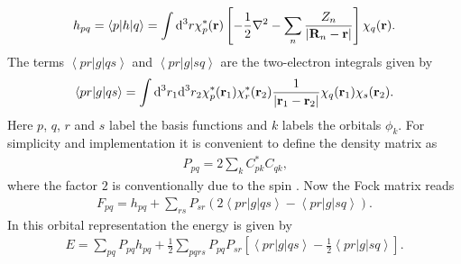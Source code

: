\documentclass[twoside,        %
			   12pt,			%
               BCOR10mm,       %
               ngerman,english  %
               ]{scrartcl}
\begin{document}
\begin{align*}
h_{pq} = \left< p|h|q\right> = \int \mathrm{d}^3 r \chi_p^*(\mathbf{r})\left[ -\frac{1}{2} \nabla^2 - \sum\limits_n \frac{Z_n}{\left| \mathbf{R}_n -\mathbf{r} \right|} \right]\chi_q(\mathbf{r})\text{.}
\end{align*} The terms $\left<pr|g|qs\right>$ and $\left<pr|g|sq\right>$ are the two-electron integrals given by
\begin{align*}
\left<pr|g|qs\right> = \int \mathrm{d}^3 r_1 \mathrm{d}^3 r_2 \chi_p^*(\mathbf{r}_1) \chi_r^*(\mathbf{r}_2) \frac{1}{\left| \mathbf{r}_1 -\mathbf{r}_2 \right|} \chi_q(\mathbf{r}_1) \chi_s(\mathbf{r}_2) \text{.}
\end{align*} Here $p$, $q$, $r$ and $s$ label the basis functions and $k$ labels the orbitals $\phi_k$.
For simplicity and implementation it is convenient to define the density matrix as
\begin{align*}
P_{pq} = 2\sum\limits_k C_{pk}^* C_{qk} \text{,}
\end{align*} where the factor $2$ is conventionally due to the spin \cite{Thijssen2007}.
Now the Fock matrix reads
\begin{align*}
F_{pq} = h_{pq} + \sum\limits_{rs} P_{sr} \left( 2 \left<pr|g|qs\right> -  \left<pr|g|sq\right> \right)\text{.}
\end{align*} In this orbital representation the energy is given by
\begin{align*}
E = \sum\limits_{pq} P_{pq}h_{pq} + \frac{1}{2}  \sum\limits_{pqrs} P_{pq}P_{sr} \left[ \left<pr|g|qs\right> -  \frac{1}{2}\left<pr|g|sq\right> \right] \text{.}
\end{align*}
    
\end{document}
